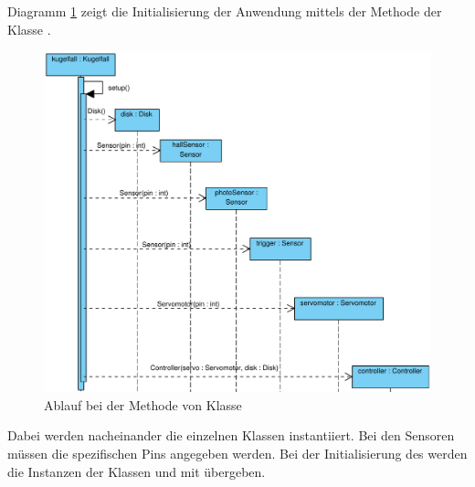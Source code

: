 Diagramm \ref{fig:setup_diagram} zeigt die Initialisierung der Anwendung mittels der Methode  der Klasse .
\begin{figure}[htbp]
	\centering
	\includegraphics[width=\linewidth]{abb/setup_cropped}
	\caption{Ablauf bei der Methode  von Klasse }
	\label{fig:setup_diagram}
\end{figure}
Dabei werden nacheinander die einzelnen Klassen instantiiert. 
Bei den Sensoren müssen die spezifischen Pins angegeben werden.
Bei der Initialisierung des  werden die Instanzen der Klassen  und  mit übergeben.

